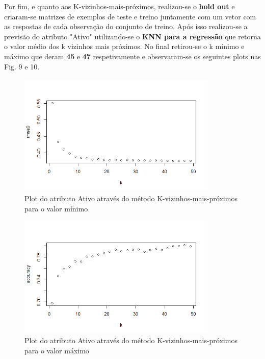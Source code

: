Por fim, e quanto aos K-vizinhos-mais-próximos, realizou-se o \textbf{hold out} e criaram-se matrizes de exemplos de teste e treino juntamente com um vetor com as respostas de cada observação do conjunto de treino. Após isso realizou-se a previsão do atributo "Ativo" utilizando-se o \textbf{KNN para a regressão} que retorna o valor médio dos k vizinhos mais próximos. No final retirou-se o k mínimo e máximo que deram \textbf{45} e \textbf{47} respetivamente e observaram-se os seguintes plots nas Fig. 9 e 10.

\begin{figure}[htbp]
\centerline{\includegraphics[width=9.5cm]{images/ex8_c_plot_min.png}}
\caption{Plot do atributo Ativo através do método K-vizinhos-mais-próximos para o valor mínimo}
\label{ex8_c_plot_min}
\end{figure}

\begin{figure}[htbp]
\centerline{\includegraphics[width=9.5cm]{images/ex8_c_plot_max.png}}
\caption{Plot do atributo Ativo através do método K-vizinhos-mais-próximos para o valor máximo}
\label{ex8_c_plot_max}
\end{figure}